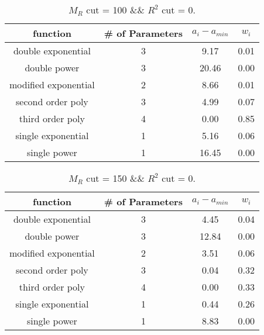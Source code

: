  
\begin{table}[H] 
\begin{center} 
\begin{tabular}{|c|c|c|c|} 
\hline function & \# of Parameters & $a_i-a_{min}$ & $w_i$ \\ \hline 
double exponential &  3 &   9.17 &   0.01 \\ 
double power &  3 &  20.46 &   0.00 \\ 
modified exponential &  2 &   8.66 &   0.01 \\ 
second order poly &  3 &   4.99 &   0.07 \\ 
third order poly &  4 &   0.00 &   0.85 \\ 
single exponential &  1 &   5.16 &   0.06 \\ 
single power &  1 &  16.45 &   0.00 \\ 
\hline 
\end{tabular} 
\caption{$M_R$ cut = 100 \&\& $R^2$ cut = 0.} 
\label{tab:FitChoices_100_0} 
\end{center} 
\end{table} 
 
 
\begin{table}[H] 
\begin{center} 
\begin{tabular}{|c|c|c|c|} 
\hline function & \# of Parameters & $a_i-a_{min}$ & $w_i$ \\ \hline 
double exponential &  3 &   4.45 &   0.04 \\ 
double power &  3 &  12.84 &   0.00 \\ 
modified exponential &  2 &   3.51 &   0.06 \\ 
second order poly &  3 &   0.04 &   0.32 \\ 
third order poly &  4 &   0.00 &   0.33 \\ 
single exponential &  1 &   0.44 &   0.26 \\ 
single power &  1 &   8.83 &   0.00 \\ 
\hline 
\end{tabular} 
\caption{$M_R$ cut = 150 \&\& $R^2$ cut = 0.} 
\label{tab:FitChoices_150_0} 
\end{center} 
\end{table} 
 
